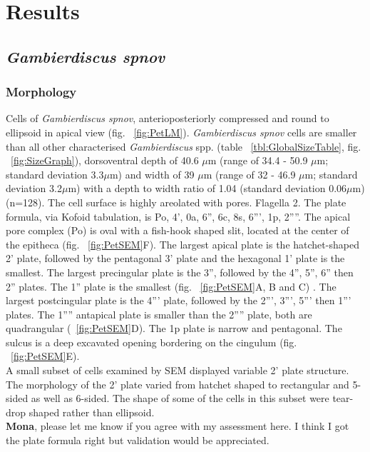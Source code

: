\documentclass[12pt]{article}
\begin{document}
\newpage
\section{Results}

\subsection{\emph{Gambierdiscus spnov}}
\subsubsection{Morphology}
Cells of \emph{Gambierdiscus spnov}, anterioposteriorly compressed and round to ellipsoid in apical view (fig. ~\ref{fig:PetLM}). \emph{Gambierdiscus spnov} cells are smaller than all other characterised \emph{Gambierdiscus} spp. (table ~\ref{tbl:GlobalSizeTable}, fig. ~\ref{fig:SizeGraph}), dorsoventral depth of 40.6 $\mu$m (range of 34.4 - 50.9 $\mu$m; standard deviation 3.3$\mu$m) and width of 39 $\mu$m (range of 32 - 46.9 $\mu$m; standard deviation 3.2$\mu$m) with a depth to width ratio of 1.04 (standard deviation 0.06$\mu$m)  (n=128). The cell surface is highly areolated with pores. Flagella 2. The plate formula, via Kofoid tabulation, is Po, 4', 0a, 6'', 6c, 8s, 6''', 1p, 2''''. 
The apical pore complex (Po) is oval with a fish-hook shaped slit, located at the center of the epitheca (fig. ~\ref{fig:PetSEM}F). The largest apical plate is the hatchet-shaped 2' plate, followed by the pentagonal 3' plate and the hexagonal 1' plate is the smallest. The largest precingular plate is the 3'', followed by the 4'', 5'', 6'' then 2'' plates. The 1'' plate is the smallest (fig. ~\ref{fig:PetSEM}A, B and C) . The largest postcingular plate is the 4''' plate, followed by the 2''', 3''', 5''' then 1''' plates. The 1'''' antapical plate is smaller than the 2'''' plate, both are quadrangular (~\ref{fig:PetSEM}D). The 1p plate is narrow and pentagonal. The sulcus is a deep excavated opening bordering on the cingulum (fig. ~\ref{fig:PetSEM}E).\\
A small subset of cells examined by SEM displayed variable 2' plate structure. The morphology of the 2' plate varied from hatchet shaped to rectangular and 5-sided as well as 6-sided. The shape of some of the cells in this subset were tear-drop shaped rather than ellipsoid. \\
\textbf{Mona}, please let me know if you agree with my assessment here. I think I got the plate formula right but validation would be appreciated.
\end{document}
